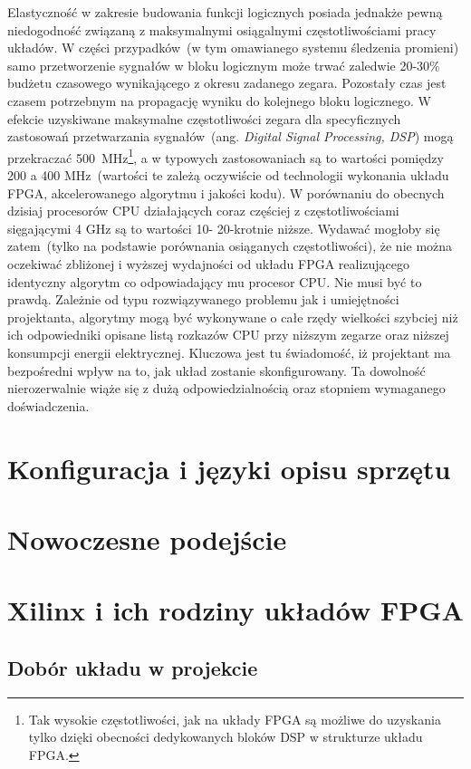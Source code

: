 Elastyczność w zakresie budowania funkcji logicznych posiada jednakże pewną niedogodność związaną z maksymalnymi osiągalnymi częstotliwościami pracy układów. W części przypadków~(w tym omawianego systemu śledzenia promieni) samo przetworzenie sygnałów w bloku logicznym może trwać zaledwie 20-30\% budżetu czasowego wynikającego z okresu zadanego zegara. Pozostały czas jest czasem potrzebnym na propagację wyniku do kolejnego bloku logicznego. W efekcie uzyskiwane maksymalne częstotliwości zegara dla specyficznych zastosowań przetwarzania sygnałów~(ang. \textit{Digital Signal Processing, DSP}) mogą przekraczać 500~MHz\footnote{Tak wysokie częstotliwości, jak na układy FPGA są możliwe do uzyskania tylko dzięki obecności dedykowanych bloków DSP w strukturze układu FPGA.}, a w typowych zastosowaniach są to wartości pomiędzy 200 a 400 MHz~(wartości te zależą oczywiście od technologii wykonania układu FPGA, akcelerowanego algorytmu i jakości kodu). W porównaniu do obecnych dzisiaj procesorów CPU działających coraz częściej z częstotliwościami sięgającymi 4 GHz są to wartości 10- 20-krotnie niższe. Wydawać mogłoby się zatem~(tylko na podstawie porównania osiąganych częstotliwości), że nie można oczekiwać zbliżonej i wyższej wydajności od układu FPGA realizującego identyczny algorytm co odpowiadający mu procesor CPU. Nie musi być to prawdą. Zależnie od typu rozwiązywanego problemu jak i umiejętności projektanta, algorytmy mogą być wykonywane o całe rzędy wielkości szybciej niż ich odpowiedniki opisane listą rozkazów CPU przy niższym zegarze oraz niższej konsumpcji energii elektrycznej. Kluczowa jest tu świadomość, iż projektant ma bezpośredni wpływ na to, jak układ zostanie skonfigurowany. Ta dowolność nierozerwalnie wiąże się z dużą odpowiedzialnością oraz stopniem wymaganego doświadczenia.

\section{Konfiguracja i języki opisu sprzętu}
\section{Nowoczesne podejście}

\section{Xilinx i ich rodziny układów FPGA}
\subsection{Dobór układu w projekcie}

